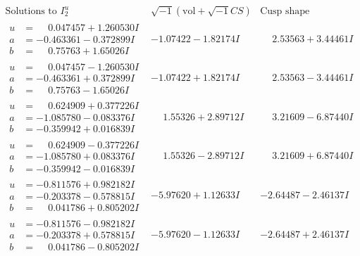 \documentclass[1p]{elsarticle_modified}
\theoremstyle{definition}
\newcommand{\I}{\sqrt{-1}}
\begin{document}
$$\begin{array}{c|c|c}  
\text{Solutions to }I^u_{2}& \I (\text{vol} + \sqrt{-1}CS) & \text{Cusp shape}\\
 \hline 
\begin{aligned}
u &= \phantom{-}0.047457 + 1.260530 I \\
a &= -0.463361 - 0.372899 I \\
b &= \phantom{-}0.75763 + 1.65026 I\end{aligned}
 & -1.07422 - 1.82174 I & \phantom{-}2.53563 + 3.44461 I \\ \hline\begin{aligned}
u &= \phantom{-}0.047457 - 1.260530 I \\
a &= -0.463361 + 0.372899 I \\
b &= \phantom{-}0.75763 - 1.65026 I\end{aligned}
 & -1.07422 + 1.82174 I & \phantom{-}2.53563 - 3.44461 I \\ \hline\begin{aligned}
u &= \phantom{-}0.624909 + 0.377226 I \\
a &= -1.085780 - 0.083376 I \\
b &= -0.359942 + 0.016839 I\end{aligned}
 & \phantom{-}1.55326 + 2.89712 I & \phantom{-}3.21609 - 6.87440 I \\ \hline\begin{aligned}
u &= \phantom{-}0.624909 - 0.377226 I \\
a &= -1.085780 + 0.083376 I \\
b &= -0.359942 - 0.016839 I\end{aligned}
 & \phantom{-}1.55326 - 2.89712 I & \phantom{-}3.21609 + 6.87440 I \\ \hline\begin{aligned}
u &= -0.811576 + 0.982182 I \\
a &= -0.203378 - 0.578815 I \\
b &= \phantom{-}0.041786 + 0.805202 I\end{aligned}
 & -5.97620 + 1.12633 I & -2.64487 - 2.46137 I \\ \hline\begin{aligned}
u &= -0.811576 - 0.982182 I \\
a &= -0.203378 + 0.578815 I \\
b &= \phantom{-}0.041786 - 0.805202 I\end{aligned}
 & -5.97620 - 1.12633 I & -2.64487 + 2.46137 I \\ \hline\begin{aligned}

\end{aligned}
\end{array}$$
\end{document}
